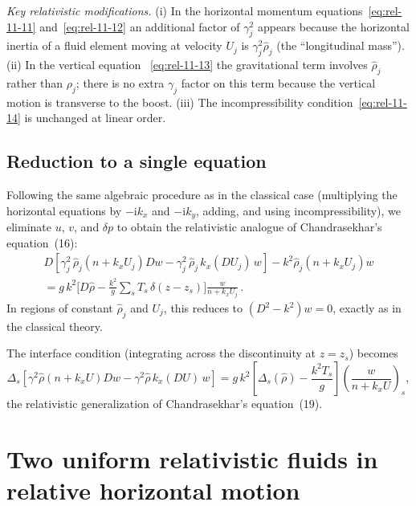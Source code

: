 \emph{Key relativistic modifications.}  (i) In the horizontal momentum
equations~\eqref{eq:rel-11-11} and~\eqref{eq:rel-11-12} an additional
factor of $\gamma_j^{2}$ appears because the horizontal inertia of a
fluid element moving at velocity $U_j$ is $\gamma_j^{2}\hat{\rho}_j$
(the ``longitudinal mass'').  (ii) In the vertical equation~%
\eqref{eq:rel-11-13} the gravitational term involves $\hat{\rho}_j$
rather than $\rho_j$; there is no extra $\gamma_j$ factor on this
term because the vertical motion is transverse to the boost.
(iii) The incompressibility condition~\eqref{eq:rel-11-14} is
unchanged at linear order.

\subsection{Reduction to a single equation}

Following the same algebraic procedure as in the classical case
(multiplying the horizontal equations by $-\mathrm{i}k_x$ and
$-\mathrm{i}k_y$, adding, and using incompressibility), we eliminate
$u$, $v$, and $\delta p$ to obtain the relativistic analogue of
Chandrasekhar's equation~(16):
\begin{multline}\label{eq:rel-11-15}
  D\!\left[\gamma_j^{2}\,\hat{\rho}_j\!\left(n + k_x U_j\right)Dw
  - \gamma_j^{2}\,\hat{\rho}_j\, k_x(DU_j)\,w\right]
  - k^{2}\hat{\rho}_j\!\left(n + k_x U_j\right) w \\
  = g\,k^{2}\bigg[D\hat{\rho}
  - \frac{k^{2}}{g}\sum_s T_s\,\delta(z - z_s)\bigg]
  \frac{w}{n + k_x U_j}\,.
\end{multline}
In regions of constant $\hat{\rho}_j$ and $U_j$, this reduces to
$(D^{2} - k^{2})w = 0$, exactly as in the classical theory.

The interface condition (integrating across the discontinuity at
$z = z_s$) becomes
\begin{equation}\label{eq:rel-11-16}
  \Delta_s\!\left[\gamma^{2}\hat{\rho}\!\left(n + k_x U\right)Dw
  - \gamma^{2}\hat{\rho}\, k_x(DU)\,w\right]
  = g\,k^{2}\!\left[\Delta_s(\hat{\rho})
  - \frac{k^{2}T_s}{g}\right]\!
  \left(\frac{w}{n + k_x U}\right)_{\!s},
\end{equation}
the relativistic generalization of Chandrasekhar's equation~(19).


\section{Two uniform relativistic fluids in relative horizontal motion}
\label{sec:rel-11-101}

